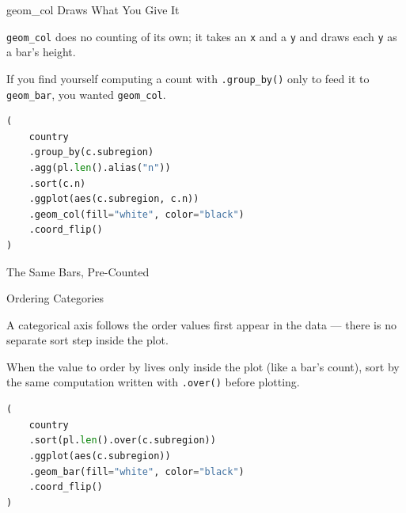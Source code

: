 \documentclass[8pt,aspectratio=169]{beamer}
\begin{document}
\begin{frame}[fragile]{geom\_col Draws What You Give It}
\begin{splitcode}{%

\texttt{geom\_col} does no counting of its own; it takes an \texttt{x} and a \texttt{y} and draws each \texttt{y} as a bar's height.

If you find yourself computing a count with \texttt{.group\_by()} only to feed it to \texttt{geom\_bar}, you wanted \texttt{geom\_col}.

}
\begin{lstlisting}[language=Python]
(
    country
    .group_by(c.subregion)
    .agg(pl.len().alias("n"))
    .sort(c.n)
    .ggplot(aes(c.subregion, c.n))
    .geom_col(fill="white", color="black")
    .coord_flip()
)
\end{lstlisting}
\end{splitcode}
\end{frame}

\begin{rightframe}{The Same Bars, Pre-Counted}
\end{rightframe}

\begin{frame}[fragile]{Ordering Categories}
\begin{splitcode}{%

A categorical axis follows the order values first appear in the data --- there is no separate sort step inside the plot.

When the value to order by lives only inside the plot (like a bar's count), sort by the same computation written with \texttt{.over()} before plotting.

}
\begin{lstlisting}[language=Python]
(
    country
    .sort(pl.len().over(c.subregion))
    .ggplot(aes(c.subregion))
    .geom_bar(fill="white", color="black")
    .coord_flip()
)
\end{lstlisting}
\end{splitcode}
\end{frame}
\end{document}
